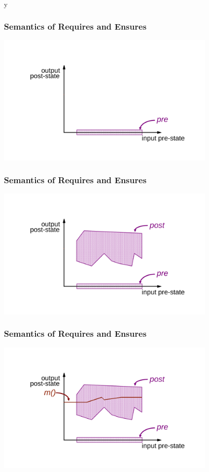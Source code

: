 \if y\MAKEHANDOUTS \documentclass[compress,landscape,handout]{beamer}
\begin{document}
\begin{frame}
\frametitle{Semantics of Requires and Ensures}
\includegraphics[width=4.25in]{requires}
\end{frame}

\begin{frame}
\frametitle{Semantics of Requires and Ensures}
\includegraphics[width=4.25in]{ensures}
\end{frame}

\begin{frame}
\frametitle{Semantics of Requires and Ensures}
\includegraphics[width=4.25in]{correctimpl}
\end{frame}
\end{document}
